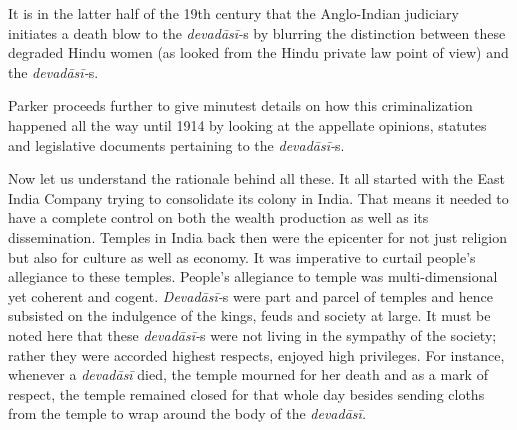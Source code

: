 It is in the latter half of the 19th century that the Anglo-Indian judiciary initiates a death blow to the \textit{devadāsī-}s by blurring the distinction between these degraded Hindu women (as looked from the Hindu private law point of view) and the \textit{devadāsī-}s.

Parker proceeds further to give minutest details on how this criminalization happened all the way until 1914 by looking at the appellate opinions, statutes and legislative documents pertaining to the \textit{devadāsī-}s.

Now let us understand the rationale behind all these. It all started with the East India Company trying to consolidate its colony in India. That means it needed to have a complete control on both the wealth production as well as its dissemination. Temples in India back then were the epicenter for not just religion but also for culture as well as economy. It was imperative to curtail people’s allegiance to these temples. People’s allegiance to temple was multi-dimensional yet coherent and cogent. \textit{Devadāsī-}s were part and parcel of temples and hence subsisted on the indulgence of the kings, feuds and society at large. It must be noted here that these \textit{devadāsī-}s were not living in the sympathy of the society; rather they were accorded highest respects, enjoyed high privileges. For instance, whenever a \textit{devadāsī }died, the temple mourned for her death and as a mark of respect, the temple remained closed for that whole day besides sending cloths from the temple to wrap around the body of the \textit{devadāsī.}


